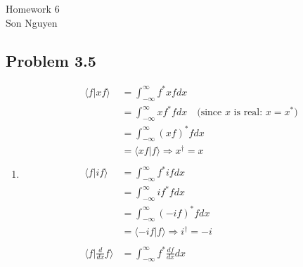 \documentclass{article}
\begin{document}
\begin{center}
	\LARGE{Homework 6}\\[1em]
	\large Son Nguyen\\[1em]
\end{center}

\subsection*{Problem 3.5}
\begin{enumerate}[label=(\alph*)]
	\item
	      \begin{align*}
		      \langle f |xf \rangle              & = \int_{-\infty}^{\infty} f^* x f dx                                                                                                   \\\
		                                         & = \int_{-\infty}^{\infty} x f^*f dx \quad \text{(since $x$ is real: \(x = x^*\))}                                                      \\
		                                         & = \int_{-\infty}^{\infty} (xf)^* f dx                                                                                                  \\
		                                         & = \langle xf | f \rangle \Rightarrow x^\dagger = x
		      \\ \\
		      \langle f | i f \rangle            & = \int_{-\infty}^{\infty} f^* i f dx                                                                                                   \\
		                                         & = \int_{-\infty}^{\infty} i f^* f dx                                                                                                   \\
		                                         & = \int_{-\infty}^{\infty} (-if)^* f dx                                                                                                 \\
		                                         & = \langle -if | f \rangle \Rightarrow i^\dagger = -i                                                                                   \\
		      \\
		      \langle f | \frac{d}{dx} f \rangle & = \int_{-\infty}^{\infty} f^* \frac{df}{dx}  dx                                                                                        \\

\end{align*}
\end{enumerate}
\end{document}
